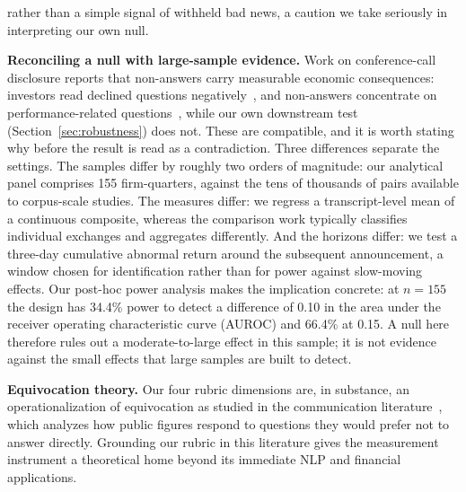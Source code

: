 \documentclass[conference]{IEEEtran}
\begin{document}
rather than a simple signal of withheld bad news, a caution we take seriously in interpreting our own null.

\textbf{Reconciling a null with large-sample evidence.} Work on conference-call disclosure reports that non-answers carry measurable economic consequences: investors read declined questions negatively~\cite{hollander2010silence}, and non-answers concentrate on performance-related questions~\cite{gow2021nonanswers}, while our own downstream test (Section~\ref{sec:robustness}) does not. These are compatible, and it is worth stating why before the result is read as a contradiction. Three differences separate the settings. The samples differ by roughly two orders of magnitude: our analytical panel comprises 155 firm-quarters, against the tens of thousands of pairs available to corpus-scale studies. The measures differ: we regress a transcript-level mean of a continuous composite, whereas the comparison work typically classifies individual exchanges and aggregates differently. And the horizons differ: we test a three-day cumulative abnormal return around the subsequent announcement, a window chosen for identification rather than for power against slow-moving effects. Our post-hoc power analysis makes the implication concrete: at $n = 155$ the design has 34.4\% power to detect a difference of 0.10 in the area under the receiver operating characteristic curve (AUROC) and 66.4\% at 0.15. A null here therefore rules out a moderate-to-large effect in this sample; it is not evidence against the small effects that large samples are built to detect.

\textbf{Equivocation theory.} Our four rubric dimensions are, in substance, an operationalization of equivocation as studied in the communication literature~\cite{bull2003microanalysis,bull1993how,clayman2001answers,rasiah2010framework}, which analyzes how public figures respond to questions they would prefer not to answer directly. Grounding our rubric in this literature gives the measurement instrument a theoretical home beyond its immediate NLP and financial applications.
\end{document}
